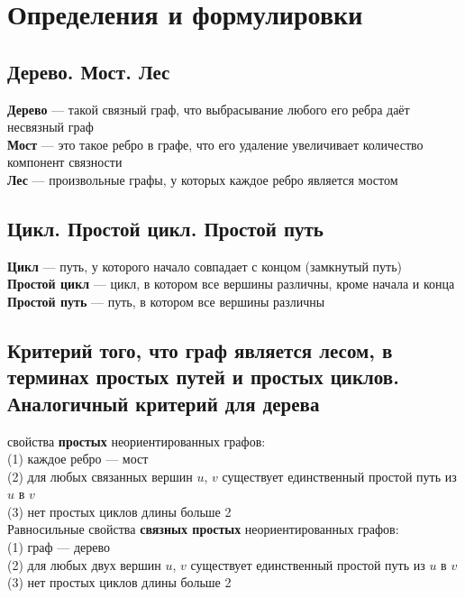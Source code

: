 \documentclass[a4paper]{article}
\begin{document}
\tableofcontents
\newpage
\section{Определения и формулировки}


\subsection{Дерево. Мост. Лес}
\textbf{Дерево} — такой связный граф, что выбрасывание любого его ребра даёт несвязный граф\\[2mm]
\indent\textbf{Мост} — это такое ребро в графе, что его удаление увеличивает количество компонент связности\\[2mm]
\indent\textbf{Лес} — произвольные графы, у которых каждое ребро является мостом

\subsection{Цикл. Простой цикл. Простой путь}
\textbf{Цикл} — путь, у которого начало совпадает с концом (замкнутый путь)\\[2mm]
\indent\textbf{Простой цикл} — цикл, в котором все вершины различны, кроме начала и конца\\[2mm]
\indent\textbf{Простой путь} — путь, в котором все вершины различны

\subsection{Критерий того, что граф является лесом, в терминах простых путей и простых циклов. Аналогичный критерий для дерева}
 свойства \textbf{простых} неориентированных графов:\\[2mm]
\indent(1) каждое ребро — мост\\[2mm]
\indent(2) для любых связанных вершин $u$, $v$ существует единственный простой путь из $u$ в $v$\\[2mm]
\indent(3) нет простых циклов длины больше 2\\[3mm]
Равносильные свойства \textbf{связных простых} неориентированных графов:\\[2mm]
\indent(1) граф — дерево\\[2mm]
\indent(2) для любых двух вершин $u$, $v$ существует единственный простой путь из $u$ в $v$\\[2mm]
\indent(3) нет простых циклов длины больше 2
\end{document}
